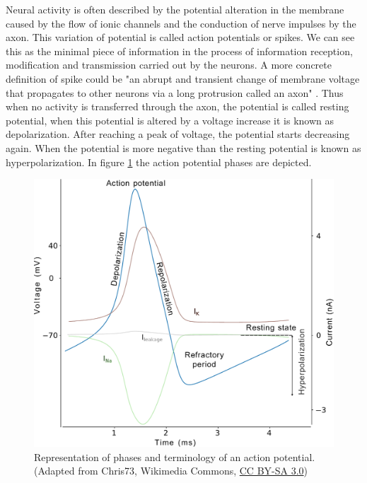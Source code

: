 Neural activity is often described by the potential alteration in the membrane caused by the flow of ionic channels and the conduction of nerve impulses by the axon. This variation of potential is called action potentials or spikes. We can see this as the minimal piece of information in the process of information reception, modification and transmission carried out by the neurons. A more concrete definition of spike could be "an abrupt and transient change of membrane voltage that propagates to other neurons via a long protrusion called an axon" \parencite{izhikevich_dynamical_2007}. Thus when no activity is transferred through the axon, the potential is called resting potential, when this potential is altered by a voltage increase it is known as depolarization. After reaching a peak of voltage, the potential starts decreasing again. When the potential is more negative than the resting potential is known as hyperpolarization. In figure \ref{fig:action potential} the action potential phases are depicted. 

\begin{figure}[htb!]
    \centering
    \includegraphics[width=\linewidth]{img/intro/action_potential.pdf}
    \caption{Representation of phases and terminology of an action potential. (Adapted from Chris73, Wikimedia Commons, \href{https://creativecommons.org/licenses/by-sa/3.0/}{CC BY-SA 3.0})}
    \label{fig:action potential}
\end{figure}

